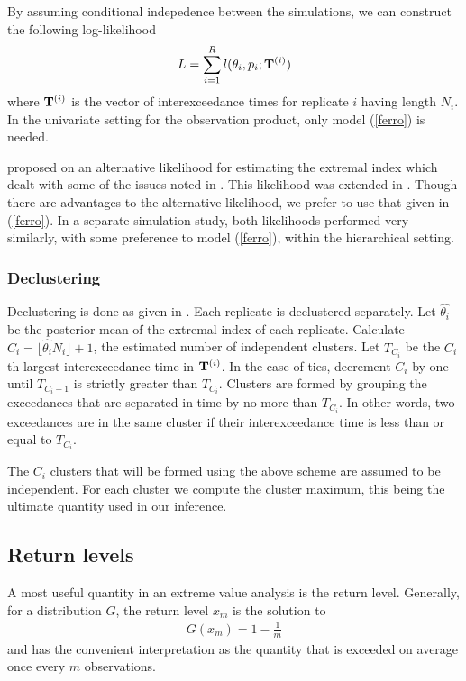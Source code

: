 By assuming conditional indepedence between the simulations, we can construct the following log-likelihood
\begin{align}
L = \sum_{i=1}^R l(\theta_i, p_i; \mathbf{\bm{T}}^{(i)}) \label{hiertheta}
\end{align}
where $\mathbf{\bm{T}}^{(i)}$ is the vector of interexceedance times for replicate $i$ having length $N_i$. In the univariate setting for the observation product, only model (\ref{ferro}) is needed.

\cite{suveges2007likelihood} proposed on an alternative likelihood for estimating the extremal index which dealt with some of the issues noted in \cite{ferro2003inference}. This likelihood was extended in \cite{suveges2010model}. Though there are advantages to the alternative likelihood, we prefer to use that given in (\ref{ferro}). In a separate simulation study, both likelihoods performed very similarly, with some preference to model (\ref{ferro}), within the hierarchical setting.

\subsubsection{Declustering}

Declustering is done as given in \cite{ferro2003inference}. Each replicate is declustered separately. Let $\hat{\theta_i}$ be the posterior mean of the extremal index of each replicate. Calculate $C_i=\lfloor \hat{\theta_i} N_i \rfloor + 1$, the estimated number of independent clusters. Let $T_{C_i}$ be the $C_i$th largest interexceedance time in $\mathbf{\bm{T}}^{(i)}$. In the case of ties, decrement $C_i$ by one until $T_{C_i+1}$ is strictly greater than $T_{C_i}$. Clusters are formed by grouping the exceedances that are separated in time by no more than $T_{C_i}$. In other words, two exceedances are in the same cluster if their interexceedance time is less than or equal to $T_{C_i}$.

The $C_i$ clusters that will be formed using the above scheme are assumed to be independent. For each cluster we compute the cluster maximum, this being the ultimate quantity used in our inference.

\subsection{Return levels}
\label{return}

A most useful quantity in an extreme value analysis is the return level. Generally, for a distribution $G$, the return level $x_m$ is the solution to
\begin{align}
G(x_m) = 1-\frac{1}{m}
\end{align}
and has the convenient interpretation as the quantity that is exceeded on average once every $m$ observations.

